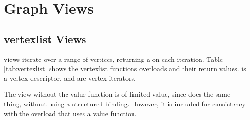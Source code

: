 \begin{comment}
Given the copyable types, it's useful to have concepts to determine if a type is a desired copyable type.
\begin{table}[h!]
\begin{center}
{\begin{tabular}{l L{12.0cm}}
\hline
    \textbf{Concept} & \textbf{Definition} \\
\hline
    \tcode{copyable_vertex<T,VId,VV=void>} & \tcode{convertible_to<T, copyable_vertex_t<VId, VV>>} \\
    \tcode{copyable_edge<T,Vid,EV=void>} & \tcode{convertible_to<T, copyable_edge_t<VId, EV>>} \\
    \tcode{copyable_neighbor<T,Vid,VV=void>} & \tcode{convertible_to<T, copyable_neighbor_t<VId, VV>>} \\
\hline
\end{tabular}}
\caption{Info Struct Concepts}
\label{tab:info_struct_concepts}
\end{center}
\end{table}

\end{comment}


\section{Graph Views}

\subsection{vertexlist Views}

 views iterate over a range of vertices, returning a  on each iteration. 
Table \ref{tab:vertexlist} shows the vertexlist functions overloads and their return values.  is a vertex
descriptor.  and  are vertex iterators.

The  view without the value function is of limited value, since  does the
same thing, without using a structured binding. However, it is included for consistency with the overload that 
uses a value function.

